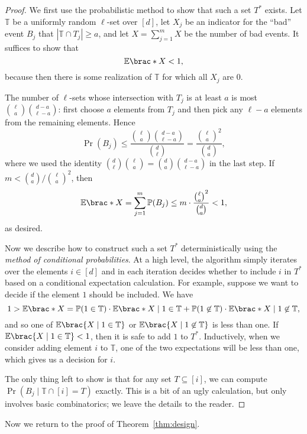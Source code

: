 \begin{proof}
  We first use the probabilistic method to show that such a set $T^*$ exists.
  Let $\mathbb{T}$ be a uniformly random $\ell$-set over $[d]$, let $X_j$
  be an indicator for the ``bad'' event $B_j$ that $|\mathbb{T} \cap T_j| \ge
  a$, and let $X = \sum_{j=1}^m X$ be the number of bad events. It suffices to
  show that \[
    \Exp\brac*{X} < 1,
  \]
  because then there is some realization of $\mathbb{T}$ for which all $X_j$
  are 0.

  The number of $\ell$-sets whose intersection with $T_j$ is at least $a$ is
  most $\binom{\ell}{a}\binom{d - a}{\ell - a}$: first choose $a$ elements from
  $T_j$ and then pick any $\ell - a$ elements from the remaining elements. Hence
  \[
    \Pr(B_j) \le \frac{\binom{\ell}{a}\binom{d - a}{\ell - a}}{\binom{d}{\ell}} =
    \frac{\binom{\ell}{a}^2}{\binom{d}{a}},
  \]
  where we used the identity $\binom{d}{\ell}\binom{\ell}{a} =
  \binom{d}{a}\binom{d - a}{\ell - a}$ in the last step. If $m < \binom{d}{a} /
  \binom{\ell}{a}^2$, then \[
    \Exp\brac*{X} =
    \sum_{j=1}^m \Pr(B_j) \le m \cdot \frac{\binom{\ell}{a}^2}{\binom{d}{a}} < 1,
  \]
  as desired.

  Now we describe how to construct such a set $T^*$ deterministically using the
  \emph{method of conditional probabilities}. At a high level, the algorithm
  simply iterates over the elements $i \in [d]$ and in each iteration decides
  whether to include $i$ in $T^*$ based on a conditional expectation
  calculation. For example, suppose we want to decide if the element $1$ should
  be included. We have \[
    1 > \Exp\brac*{X} = \Pr(1 \in \mathbb{T}) \cdot \Exp\brac*{X \mid 1 \in \mathbb{T}} 
      + \Pr(1 \not\in \mathbb{T}) \cdot \Exp\brac*{X \mid 1 \not\in \mathbb{T}},
  \]
  and so one of $\Exp\brac{X \mid 1 \in \mathbb{T}}$ or $\Exp\brac{X \mid 1 \not\in
  \mathbb{T}}$ is less than one. If $\Exp\brac{X \mid 1 \in \mathbb{T}} < 1$,
  then it is safe to add $1$ to $T^*$. Inductively, when we consider adding
  element $i$ to $\mathbb{T}$, one of the two expectations will be less than
  one, which gives us a decision for $i$.

  The only thing left to show is that for any set $T \subseteq [i]$, we can
  compute $\Pr(B_j \mid \mathbb{T} \cap [i] = T)$ exactly. This is a bit of an
  ugly calculation, but only involves basic combinatorics; we leave the details
  to the reader.
\end{proof}

Now we return to the proof of Theorem~\ref{thm:design}.

